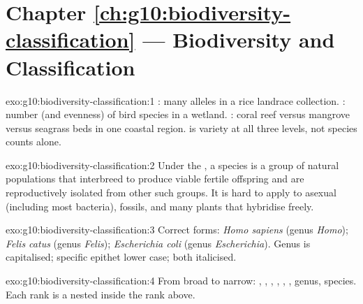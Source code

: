 \section*{Chapter \ref{ch:g10:biodiversity-classification} --- Biodiversity and Classification}

\begin{solution}{exo:g10:biodiversity-classification:1}
: many alleles in a rice landrace collection. : number (and evenness) of bird species in a wetland. : coral reef versus mangrove versus seagrass beds in one coastal
region.  is variety at all three levels, not species counts alone.
\end{solution}

\begin{solution}{exo:g10:biodiversity-classification:2}
Under the , a species is a group of natural
populations that interbreed to produce viable fertile offspring and are
reproductively isolated from other such groups. It is hard to apply to
asexual  (including most bacteria), fossils, and many plants that
hybridise freely.
\end{solution}

\begin{solution}{exo:g10:biodiversity-classification:3}
Correct forms: \emph{Homo sapiens} (genus \emph{Homo}); \emph{Felis catus}
(genus \emph{Felis}); \emph{Escherichia coli} (genus \emph{Escherichia}).
Genus is capitalised; specific epithet lower case; both italicised.
\end{solution}

\begin{solution}{exo:g10:biodiversity-classification:4}
From broad to narrow: , , , , , , genus,
species. Each rank is a  nested inside the rank above.
\end{solution}

